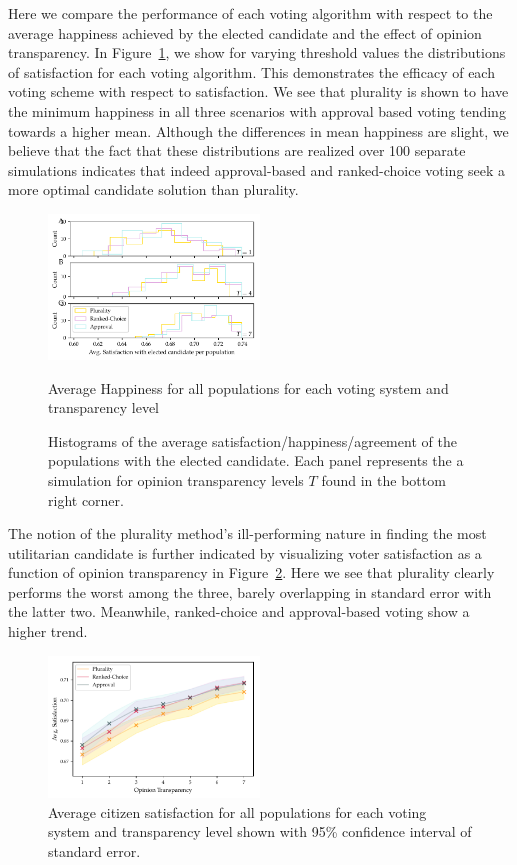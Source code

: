 Here we compare the performance of each voting algorithm with respect to the average happiness achieved by the elected candidate and
the effect of opinion transparency. \newline
\indent In Figure~\ref{fig:satisfaction_hists}, we show for varying threshold values the distributions of satisfaction for each
voting algorithm. This demonstrates the efficacy of each voting scheme with respect to satisfaction. We see that plurality
is shown to have the minimum happiness in all three scenarios with approval based voting tending towards a higher mean.
Although the differences in mean happiness are slight, we believe that the fact that these distributions are realized over
100 separate simulations indicates that indeed approval-based and ranked-choice voting seek a more optimal candidate solution
than plurality.
\begin{figure}[h!]
\includegraphics[width=0.5\textwidth]{../src/figs/new/satisfaction-hist_avgperpop.pdf}
\caption{Average Happiness for all populations for each voting system and transparency level}
\label{fig:satisfaction_hists}
    \caption{Histograms of the average satisfaction/happiness/agreement of the populations with the elected
    candidate. Each panel represents the a simulation for opinion transparency levels $T$ found
    in the bottom right corner. }
\end{figure}
The notion of the plurality method's ill-performing nature in finding the most utilitarian candidate
is further indicated by visualizing voter satisfaction as a function of opinion transparency in Figure~\ref{fig:avghapp_by_transparency}.
Here we see that plurality clearly performs the worst among the three, barely overlapping in standard error with the latter two.
Meanwhile, ranked-choice and approval-based voting show a higher trend.
\begin{figure}[h!]
\includegraphics[width=0.5\textwidth]{../src/figs/new/avghapp_transparency.pdf}
\caption{Average citizen satisfaction for all populations for each voting system and transparency level shown
    with 95\% confidence interval of standard error.}
\label{fig:avghapp_by_transparency}
\end{figure}
